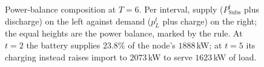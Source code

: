 \begin{figure}[!t]
\caption{Power-balance composition at $T = 6$.  Per interval, supply
($P_{\text{Subs}}^t$ plus discharge) on the left against demand ($p_L^t$ plus
charge) on the right; the equal heights are the power balance,
marked by the rule.  At $t = 2$ the battery supplies
$23.8\%$ of the node's $1888$\,kW; at $t = 5$ its charging instead raises
import to $2073$\,kW to serve $1623$\,kW of load.}
\label{fig:balance}
\end{figure}
